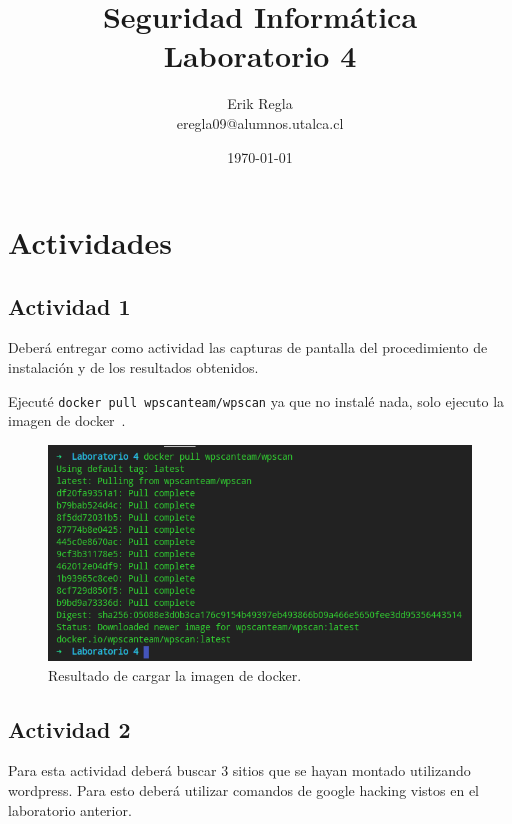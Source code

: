 \documentclass[11pt]{utalcaDoc}
\title{{\bf Seguridad Informática}\\ Laboratorio 4}
\author{Erik Regla\\ eregla09@alumnos.utalca.cl}
\date{\today}
\begin{document}
\maketitle
\newpage
\tableofcontents
\newpage

\section{Actividades}
\subsection{Actividad 1}{Deberá entregar como actividad las capturas de pantalla del procedimiento de instalación y
de los resultados obtenidos.}

Ejecuté \texttt{docker pull wpscanteam/wpscan} ya que no instalé nada, solo ejecuto la imagen de docker~\cite{REF:wpscan}.


\begin{figure}[H]
	\centering
	\centering\includegraphics[width=.80\textwidth]{images/docker.png}
\caption{Resultado de cargar la imagen de docker.}
\label{FIG:docker}
\end{figure}

\subsection{Actividad 2}{Para esta actividad deberá buscar 3 sitios que se hayan montado utilizando wordpress. Para
esto deberá utilizar comandos de google hacking vistos en el laboratorio anterior.}
\end{document}

